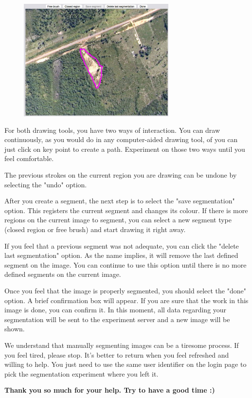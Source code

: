 \begin{figure}[h!]
  \centering
  \includegraphics[width=0.7\textwidth]{imgs/manualseginstr_fig7}
\end{figure}

For both drawing tools, you have two ways of interaction. You can draw continuously, as you would do in any computer-aided drawing tool, of you can just click on key point to create a path. Experiment on those two ways until you feel comfortable.

The previous strokes on the current region you are drawing can be undone by selecting the "undo" option.

After you create a segment, the next step is to select the "save segmentation" option. This registers the current segment and changes its colour. If there is more regions on the current image to segment, you can select a new segment type (closed region or free brush) and start drawing it right away.

If you feel that a previous segment was not adequate, you can click the "delete last segmentation" option. As the name implies, it will remove the last defined segment on the image. You can continue to use this option until there is no more defined segments on the current image.

Once you feel that the image is properly segmented, you should select the "done" option. A brief confirmation box will appear. If you are sure that the work in this image is done, you can confirm it. In this moment, all data regarding your segmentation will be sent to the experiment server and a new image will be shown.

We understand that manually segmenting images can be a tiresome process. If you feel tired, please stop. It's better to return when you feel refreshed and willing to help. You just need to use the same user identifier on the login page to pick the segmentation experiment where you left it.

\textbf{Thank you so much for your help. Try to have a good time :)}